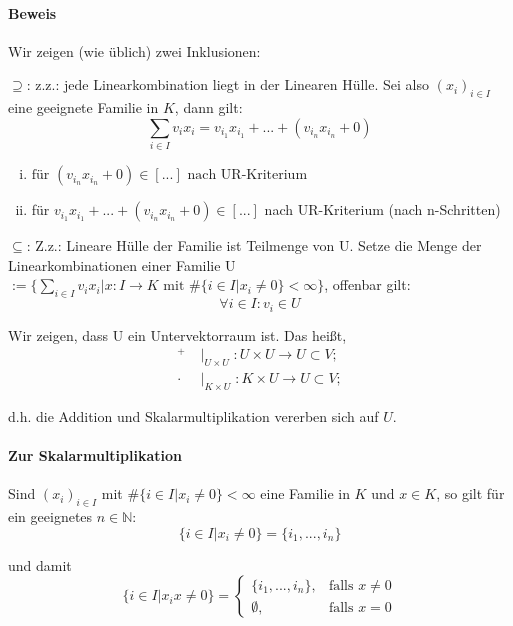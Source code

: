 \paragraph{Beweis}
	Wir zeigen (wie üblich) zwei Inklusionen:	

	$\supseteq$: z.z.: jede Linearkombination liegt in der Linearen Hülle. Sei also $(x_i)_{i\in I}$ eine geeignete Familie in $ K $, dann gilt:
	\begin{equation*}
		\sum_{i\in I} v_i x_i = v_{i_1} x_{i_1} + ... + (v_{i_n}x_{i_n}+0)
	\end{equation*}

	\begin{enumerate}[(i)]
		\item $\text{für } (v_{i_n}x_{i_n}+0) \in [...] \text{ nach UR-Kriterium}$
		\item für $v_{i_1}x_{i_1} + ... + (v_{i_n}x_{i_n}+0) \in [...]$ nach UR-Kriterium (nach n-Schritten)
	\end{enumerate}

	$\subseteq$: Z.z.: Lineare Hülle der Familie ist Teilmenge von U. Setze die Menge der Linearkombinationen einer Familie U $:= \{{\sum_{i\in I} v_ix_i| x: I\to K \text{ mit } \#\{{i\in I| x_i \neq 0\}} < \infty\}}$, offenbar gilt:
	\begin{equation*}
		\forall i\in I: v_i\in U
	\end{equation*}

	Wir zeigen, dass U ein Untervektorraum ist. Das heißt,
	\begin{align*}
	^+    & \mid_{U\times U}: U\times U \to U \subset V;\\
	\cdot & \mid_{K\times U}: K\times U \to U \subset V;
	\end{align*}
	
	d.h. die Addition und Skalarmultiplikation vererben sich auf $ U $.

\paragraph{Zur Skalarmultiplikation}
	Sind $(x_i)_{i\in I}$ mit $\#\{i\in I| x_i \neq 0\}<\infty$ eine Familie in $ K $ und $x\in K$, so gilt für ein geeignetes $n\in \mathbb{N}$:
	\begin{equation*}
		\{i\in I| x_i \neq 0\} = \{i_1, ... , i_n\}
	\end{equation*}

	und damit 
	\begin{equation*}
		\{i\in I| x_ix\neq 0\} =
		\begin{cases}
			\{{i_1,...,i_n\}},& \text{falls }x \neq 0\\
			\emptyset,& \text{falls }x = 0
		\end{cases}
	\end{equation*}

